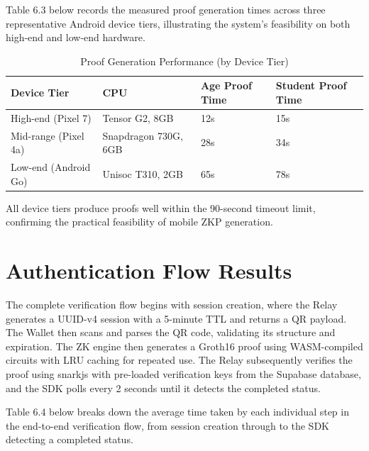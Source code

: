Table 6.3 below records the measured proof generation times across three representative Android device tiers, illustrating the system's feasibility on both high-end and low-end hardware.

\begin{table}[H]
\centering
\caption{Proof Generation Performance (by Device Tier)}
\begin{tabular}{|l|l|l|l|}
\hline
\textbf{Device Tier} & \textbf{CPU} & \textbf{Age Proof Time} & \textbf{Student Proof Time} \\
\hline
High-end (Pixel 7) & Tensor G2, 8GB & 12s & 15s \\
Mid-range (Pixel 4a) & Snapdragon 730G, 6GB & 28s & 34s \\
Low-end (Android Go) & Unisoc T310, 2GB & 65s & 78s \\
\hline
\end{tabular}
\end{table}

All device tiers produce proofs well within the 90-second timeout limit, confirming the practical feasibility of mobile ZKP generation.

\section{Authentication Flow Results}

The complete verification flow begins with session creation, where the Relay generates a UUID-v4 session with a 5-minute TTL and returns a QR payload. The Wallet then scans and parses the QR code, validating its structure and expiration. The ZK engine then generates a Groth16 proof using WASM-compiled circuits with LRU caching for repeated use. The Relay subsequently verifies the proof using snarkjs with pre-loaded verification keys from the Supabase database, and the SDK polls every 2 seconds until it detects the completed status.

Table 6.4 below breaks down the average time taken by each individual step in the end-to-end verification flow, from session creation through to the SDK detecting a completed status.

